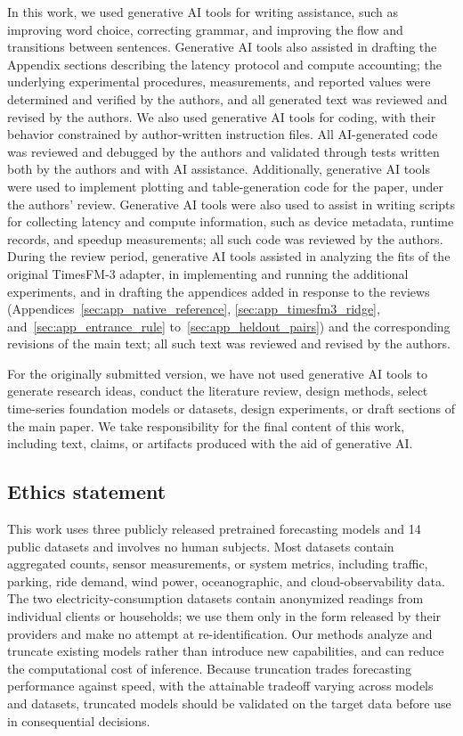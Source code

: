 \documentclass{article} %
\begin{document}
In this work, we used generative AI tools for writing assistance, such as improving word choice, correcting grammar, and improving the flow and transitions between sentences. Generative AI tools also assisted in drafting the Appendix sections describing the latency protocol and compute accounting; the underlying experimental procedures, measurements, and reported values were determined and verified by the authors, and all generated text was reviewed and revised by the authors. We also used generative AI tools for coding, with their behavior constrained by author-written instruction files. All AI-generated code was reviewed and debugged by the authors and validated through tests written both by the authors and with AI assistance. Additionally, generative AI tools were used to implement plotting and table-generation code for the paper, under the authors' review. Generative AI tools were also used to assist in writing scripts for collecting latency and compute information, such as device metadata, runtime records, and speedup measurements; all such code was reviewed by the authors. During the review period, generative AI tools assisted in analyzing the fits of the original TimesFM-3 adapter, in implementing and running the additional experiments, and in drafting the appendices added in response to the reviews (Appendices~\ref{sec:app_native_reference}, \ref{sec:app_timesfm3_ridge}, and~\ref{sec:app_entrance_rule} to~\ref{sec:app_heldout_pairs}) and the corresponding revisions of the main text; all such text was reviewed and revised by the authors.

For the originally submitted version, we have not used generative AI tools to generate research ideas, conduct the literature review, design methods, select time-series foundation models or datasets, design experiments, or draft sections of the main paper. We take responsibility for the final content of this work, including text, claims, or artifacts produced with the aid of generative AI.

\subsection*{Ethics statement}

This work uses three publicly released pretrained forecasting models and 14 public datasets and involves no human subjects. Most datasets contain aggregated counts, sensor measurements, or system metrics, including traffic, parking, ride demand, wind power, oceanographic, and cloud-observability data. The two electricity-consumption datasets contain anonymized readings from individual clients or households; we use them only in the form released by their providers and make no attempt at re-identification. Our methods analyze and truncate existing models rather than introduce new capabilities, and can reduce the computational cost of inference. Because truncation trades forecasting performance against speed, with the attainable tradeoff varying across models and datasets, truncated models should be validated on the target data before use in consequential decisions.
\end{document}
